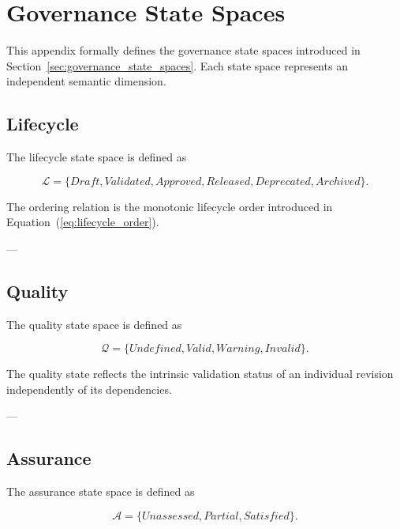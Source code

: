 \documentclass[10pt]{article}
\begin{document}
	\section{Governance State Spaces}
	\label{appendix:state_spaces}
	
	This appendix formally defines the governance state spaces introduced in Section~\ref{sec:governance_state_spaces}. Each state space represents an independent semantic dimension.
	
	\subsection{Lifecycle}
	
	The lifecycle state space is defined as
	
	\begin{equation}
		\mathcal{L}=
		\{
		Draft,
		Validated,
		Approved,
		Released,
		Deprecated,
		Archived
		\}.
		\label{eq:lifecycle_space}
	\end{equation}
	
	The ordering relation is the monotonic lifecycle order introduced in Equation~(\ref{eq:lifecycle_order}).
	
	---
	
	\subsection{Quality}
	
	The quality state space is defined as
	
	\begin{equation}
		\mathcal{Q}=
		\{
		Undefined,
		Valid,
		Warning,
		Invalid
		\}.
		\label{eq:quality_space}
	\end{equation}
	
	The quality state reflects the intrinsic validation status of an individual revision independently of its dependencies.
	
	---
	
	\subsection{Assurance}
	
	The assurance state space is defined as
	
	\begin{equation}
		\mathcal{A}=
		\{
		Unassessed,
		Partial,
		Satisfied
		\}.
		\label{eq:assurance_space}
	\end{equation}
	
\end{document}
